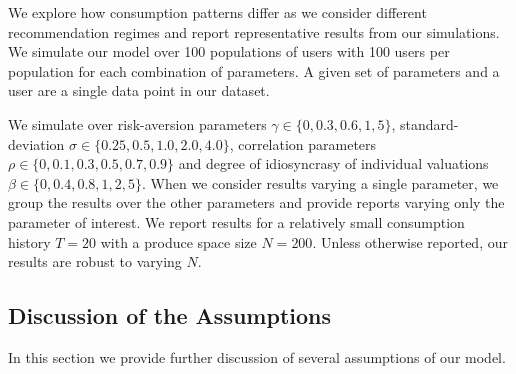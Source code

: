 \documentclass[sigconf]{acmart}
\begin{document}
We explore how consumption patterns differ as we consider different recommendation regimes and report representative results from our simulations. We simulate our model over 100 populations of users with 100 users per population for each combination of parameters. 
A given set of parameters and a user are a single data point in our dataset.
\par

We simulate over risk-aversion parameters $\gamma \in \{ 0, 0.3, 0.6, 1, 5 \}$, standard-deviation $\sigma \in \{ 0.25, 0.5, 1.0, 2.0, 4.0 \}$, correlation parameters $\rho\in \{ 0, 0.1, 0.3, 0.5, 0.7, 0.9 \} $ and degree of idiosyncrasy of individual valuations $\beta \in \{ 0, 0.4, 0.8, 1, 2, 5\}$. When we consider results varying a single parameter, we group the results over the other parameters and provide reports varying only the parameter of interest. We report results for a relatively small consumption history $T=20$ with a produce space size $N=200$. Unless otherwise reported, our results are robust to varying $N$.

\subsection{Discussion of the Assumptions}
In this section we provide further discussion of several assumptions of our model.
\par
\end{document}

